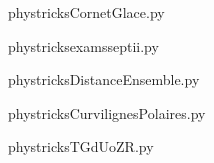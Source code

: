     

    \clearpage
    


    \newcommand{\CaptionFigCornetGlace}{<+Type your caption here+>}
    \begin{center}
        
    \end{center}
    phystricksCornetGlace.py

    

    \clearpage
    


    \newcommand{\CaptionFigexamsseptii}{<+Type your caption here+>}
    \begin{center}
        
    \end{center}
    phystricksexamsseptii.py

    

    \clearpage
    


    \newcommand{\CaptionFigDistanceEnsemble}{<+Type your caption here+>}
    \begin{center}
        
    \end{center}
    phystricksDistanceEnsemble.py

    

    \clearpage
    


    \newcommand{\CaptionFigCurvilignesPolaires}{<+Type your caption here+>}
    \begin{center}
        
    \end{center}
    phystricksCurvilignesPolaires.py

    

    \clearpage
    


    \newcommand{\CaptionFigTGdUoZR}{<+Type your caption here+>}
    \begin{center}
        
    \end{center}
    phystricksTGdUoZR.py

    

    \clearpage
    


